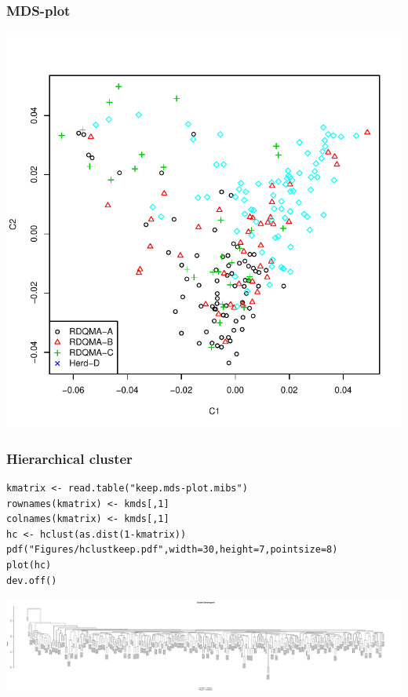 \documentclass[pdf]{beamer}
\begin{document}
\begin{frame}
\frametitle{MDS-plot}
\begin{center}
\includegraphics[scale=0.6]{Figures/mdsplotremove.pdf} 
\end{center}
\end{frame}

\begin{frame}[fragile]
\frametitle{Hierarchical cluster}
\begin{tiny}
\begin{verbatim}
kmatrix <- read.table("keep.mds-plot.mibs")
rownames(kmatrix) <- kmds[,1]
colnames(kmatrix) <- kmds[,1]
hc <- hclust(as.dist(1-kmatrix))
pdf("Figures/hclustkeep.pdf",width=30,height=7,pointsize=8)
plot(hc)
dev.off()
\end{verbatim}
\end{tiny}
\begin{center}
\includegraphics[scale=0.2]{Figures/hclustkeep.pdf} 
\end{center}
\end{frame}
\end{document}
